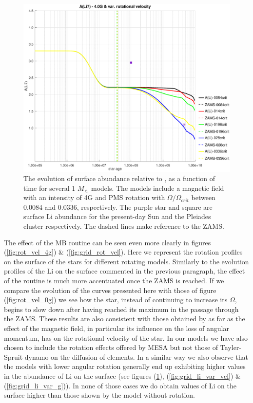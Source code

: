 \documentclass[fleqn,usenatbib]{mnras}
\begin{document}
\begin{figure}
	\includegraphics[trim = 35mm 15mm 20mm 15mm, clip,width=\columnwidth]{figures/li_var_vel_4_0g.eps}
    \caption{The evolution of surface  abundance relative to , as a function of time for several 1 $M_{\sun}$ models. The models include a magnetic field with an intensity of 4G and PMS rotation with $\Omega / \Omega_{crit}$ between 0.0084 and 0.0336, respectively. The purple star and square are surface Li abundance for the present-day Sun \citep{Asplund2009} and the Pleiades cluster \citep{Sestito2005} respectively. The dashed lines make reference to the ZAMS.}
    \label{fig:li_var_vel_4_0g}
\end{figure}

The effect of the MB routine can be seen even more clearly in figures (\ref{fig:rot_vel_4g}) \& (\ref{fig:grid_rot_vel}). Here we represent the rotation profiles on the surface of the stars for different rotating models. Similarly to the evolution profiles of the Li on the surface commented in the previous paragraph, the effect of the routine is much more accentuated once the ZAMS is reached. If we compare the evolution of the curves presented here with those of figure (\ref{fig:rot_vel_0g}) we see how the star, instead of continuing to increase its $\Omega$, begins to slow down after having reached its maximum in the passage through the ZAMS. These results are also consistent with those obtained by \citet{Eggenberger2010} as far as the effect of the magnetic field, in particular its influence on the loss of angular momentum, has on the rotational velocity of the star. In our models we have also chosen to include the rotation effects offered by MESA but not those of Tayler-Spruit dynamo on the diffusion of elements. In a similar way we also observe that the models with lower angular rotation generally end up exhibiting higher values in the abundance of Li on the surface (see figures (\ref{fig:li_var_vel_4_0g}), (\ref{fig:grid_li_var_vel}) \& (\ref{fig:grid_li_var_g})). In none of those cases we do obtain values of Li on the surface higher than those shown by the model without rotation.\par
\end{document}
